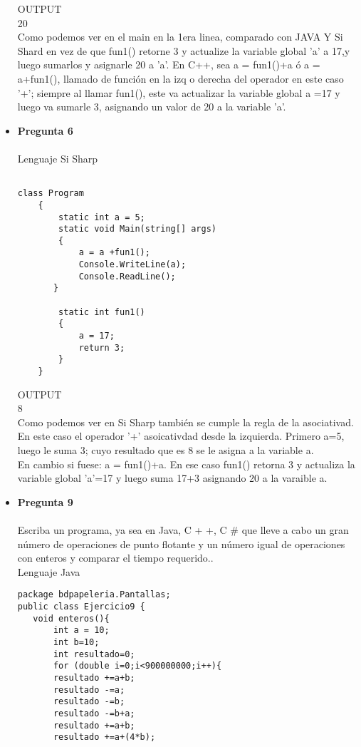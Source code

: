 \documentclass[12pt,oneside]{article}
\begin{document}
\begin{itemize}
OUTPUT\\
20\\
Como podemos ver en el main en la 1era linea, comparado con JAVA Y Si Shard en vez de que fun1() retorne 3 y actualize la variable global 'a' a 17,y luego sumarlos y asignarle 20 a 'a'. En C++, sea a = fun1()+a  ó  a = a+fun1(), llamado de función en la izq o derecha del operador en este caso '+'; siempre al llamar fun1(), este va actualizar la variable global a =17 y luego va sumarle 3, asignando un valor de 20 a  la variable 'a'. 


\item {\bf Pregunta 6} \\\\
Lenguaje Si Sharp\\
\begin{lstlisting}[frame=single]  % Start your code-block

class Program
    {
        static int a = 5;
        static void Main(string[] args)
        {
            a = a +fun1();
            Console.WriteLine(a);
            Console.ReadLine();
       }

        static int fun1()
        {
            a = 17;
            return 3;
        }
    }
\end{lstlisting}
OUTPUT\\
8\\ 
Como podemos ver en Si Sharp también se cumple la regla de la asociativad. En este caso el operador '+' asoicativdad desde la izquierda. Primero a=5, luego le suma 3; cuyo resultado que es 8 se le asigna a la variable a.\\
En cambio si fuese:  a = fun1()+a. En ese caso fun1() retorna 3 y actualiza la variable global 'a'=17 y luego suma 17+3 asignando 20 a la varaible a.




\item {\bf Pregunta 9} \\\\
Escriba un programa, ya sea en Java, C + +, C \#  que lleve a cabo un gran número 
de operaciones de punto flotante y un número igual de operaciones con enteros 
y comparar el tiempo requerido..\\


Lenguaje Java\\
\begin{lstlisting}[frame=single]  % Start your code-block
package bdpapeleria.Pantallas;
public class Ejercicio9 {
   void enteros(){
       int a = 10;
       int b=10;
       int resultado=0;
       for (double i=0;i<900000000;i++){
       resultado +=a+b;
       resultado -=a;
       resultado -=b;
       resultado -=b+a;
       resultado +=a+b;
       resultado +=a+(4*b);
       

\end{lstlisting}
\end{itemize}
\end{document}
